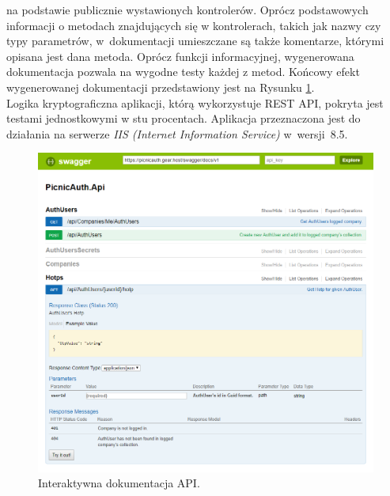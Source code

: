 na podstawie publicznie wystawionych kontrolerów. 
Oprócz podstawowych informacji o metodach znajdujących się w kontrolerach, takich jak nazwy czy typy parametrów, 
w~dokumentacji umieszczane są także komentarze, którymi opisana jest dana metoda. Oprócz funkcji informacyjnej, 
wygenerowana dokumentacja pozwala na wygodne testy każdej z metod. 
Końcowy efekt wygenerowanej dokumentacji przedstawiony jest na Rysunku \ref{swagger}. \\
Logika kryptograficzna aplikacji, którą wykorzystuje REST API, pokryta jest testami jednostkowymi w stu procentach.
Aplikacja przeznaczona jest do działania na serwerze \textit{IIS (Internet Information Service)} w~wersji~8.5.
\begin{figure}[t]
    \centering
	\includegraphics[width=\textwidth]{content/images/swagger}
    \caption{Interaktywna dokumentacja API.}
    \label{swagger}
\end{figure}

